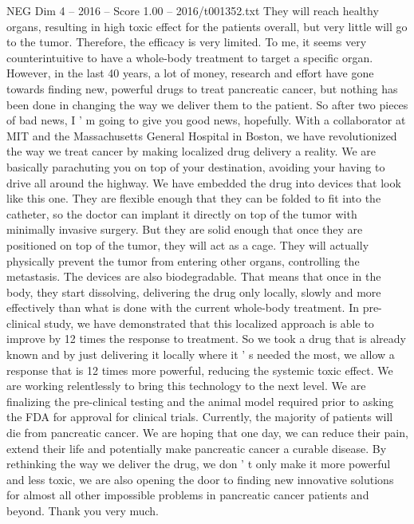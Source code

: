 \begin{textsample}{NEG Dim 4 – 2016 – Score 1.00 – 2016/t001352.txt}
They will reach healthy organs, resulting in high toxic effect for the patients overall, but very little will go to the tumor.
Therefore, the efficacy is very limited.
To me, it seems very counterintuitive to have a whole-body treatment to target a specific organ.
However, in the last 40 years, a lot of money, research and effort have gone towards finding new, powerful drugs to treat pancreatic cancer, but nothing has been done in changing the way we deliver them to the patient.
So after two pieces of bad news, I ' m going to give you good news, hopefully.
With a collaborator at MIT and the Massachusetts General Hospital in Boston, we have revolutionized the way we treat cancer by making localized drug delivery a reality.
We are basically parachuting you on top of your destination, avoiding your having to drive all around the highway.
We have embedded the drug into devices that look like this one.
They are flexible enough that they can be folded to fit into the catheter, so the doctor can implant it directly on top of the tumor with minimally invasive surgery.
But they are solid enough that once they are positioned on top of the tumor, they will act as a cage.
They will actually physically prevent the tumor from entering other organs, controlling the metastasis.
The devices are also biodegradable.
That means that once in the body, they start dissolving, delivering the drug only locally, slowly and more effectively than what is done with the current whole-body treatment.
In pre-clinical study, we have demonstrated that this localized approach is able to improve by 12 times the response to treatment.
So we took a drug that is already known and by just delivering it locally where it ' s needed the most, we allow a response that is 12 times more powerful, reducing the systemic toxic effect.
We are working relentlessly to bring this technology to the next level.
We are finalizing the pre-clinical testing and the animal model required prior to asking the FDA for approval for clinical trials.
Currently, the majority of patients will die from pancreatic cancer.
We are hoping that one day, we can reduce their pain, extend their life and potentially make pancreatic cancer a curable disease.
By rethinking the way we deliver the drug, we don ' t only make it more powerful and less toxic, we are also opening the door to finding new innovative solutions for almost all other impossible problems in pancreatic cancer patients and beyond.
Thank you very much.

\end{textsample}
